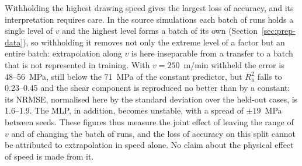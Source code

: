 \documentclass[pdflatex,sn-basic,Numbered]{sn-jnl}
\begin{document}
Withholding the highest drawing speed gives the largest loss of accuracy, and its interpretation requires care. In the source simulations each batch of runs holds a single level of $v$ and the highest level forms a batch of its own (Section~\ref{sec:prep-data}), so withholding it removes not only the extreme level of a factor but an entire batch: extrapolation along $v$ is here inseparable from a transfer to a batch that is not represented in training. With $v=250$~m/min withheld the error is 48--56~MPa, still below the 71~MPa of the constant predictor, but $R^2_{\mathrm{n}}$ falls to 0.23--0.45 and the shear component is reproduced no better than by a constant: its NRMSE, normalised here by the standard deviation over the held-out cases, is 1.6--1.9. The MLP, in addition,
becomes unstable, with a spread of $\pm19$~MPa between seeds. These figures thus measure the joint effect of leaving the range of $v$ and of changing the batch of runs, and the loss of accuracy on this split cannot be attributed to extrapolation in speed alone. No claim about the physical effect of speed is made from it.
\end{document}
